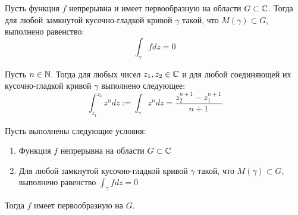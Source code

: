 \begin{corollary}
	Пусть функция $f$ непрерывна и имеет первообразную на области $G \subset \mathbb{C}$. Тогда для любой замкнутой кусочно-гладкой кривой $\gamma$ такой, что $M(\gamma) \subset G$, выполнено равенство:
	\[\int_\gamma fdz = 0\]
\end{corollary}

\begin{unnecessary}
    \begin{example}
    	Пусть $n \in \mathbb{N}$. Тогда для любых чисел $z_1, z_2 \in \mathbb{C}$ и для любой соединяющей их кусочно-гладкой кривой $\gamma$ выполнено следующее:
    	\[\int_{z_1}^{z_2}z^ndz := \int_\gamma z^ndz = \frac{z_2^{n+1} - z_1^{n+1}}{n+1}\]
    \end{example}
\end{unnecessary}

\begin{proposition}
\label{always-have-pervoobraznaya}
    Пусть выполнены следующие условия:
    \begin{enumerate}
        \item Функция $f$ непрерывна на области $G \subset \mathbb{C}$
        \item Для любой замкнутой кусочно-гладкой кривой $\gamma$ такой, что $M(\gamma) \subset G$, выполнено равенство $\int_\gamma fdz = 0$
    \end{enumerate}

    Тогда $f$ имеет первообразную на $G$.
\end{proposition}

